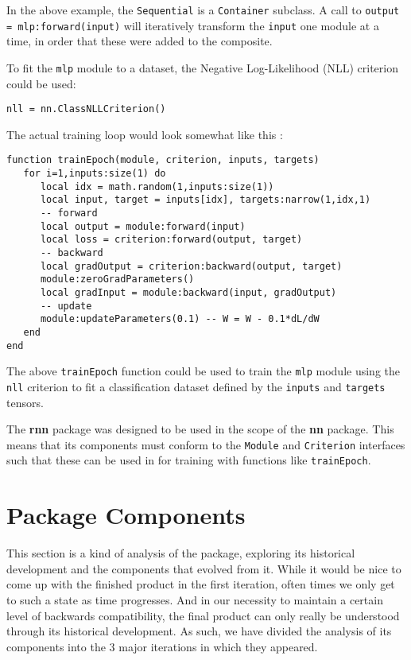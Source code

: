 \documentclass{article} %
\providecommand{\inlinecode}[1]{\texttt{#1}}
\begin{document}
In the above example, the \inlinecode{Sequential} is a \inlinecode{Container} subclass.
A call to \inlinecode{output = mlp:forward(input)} will iteratively transform the \inlinecode{input}
one module at a time, in order that these were added to the composite.

To fit the \inlinecode{mlp} module to a dataset, the Negative Log-Likelihood (NLL) criterion could be used:

\begin{verbatim}
nll = nn.ClassNLLCriterion()
\end{verbatim}

The actual training loop would look somewhat like this :
\begin{verbatim}
function trainEpoch(module, criterion, inputs, targets)
   for i=1,inputs:size(1) do
      local idx = math.random(1,inputs:size(1))
      local input, target = inputs[idx], targets:narrow(1,idx,1)
      -- forward
      local output = module:forward(input)
      local loss = criterion:forward(output, target)
      -- backward
      local gradOutput = criterion:backward(output, target)
      module:zeroGradParameters()
      local gradInput = module:backward(input, gradOutput)
      -- update
      module:updateParameters(0.1) -- W = W - 0.1*dL/dW
   end
end
\end{verbatim}

The above \inlinecode{trainEpoch} function could be used to train the
\inlinecode{mlp} module using the \inlinecode{nll} criterion
to fit a classification dataset defined by the \inlinecode{inputs} and 
\inlinecode{targets} tensors. 

The \textbf{rnn} package was designed to be used in the scope of the \textbf{nn} package.
This means that its components must conform to the \inlinecode{Module} and 
\inlinecode{Criterion} interfaces such that these can be used in 
for training with functions like \inlinecode{trainEpoch}.

\section{Package Components}

This section is a kind of analysis of the package, exploring 
its historical development and the components that evolved from it. 
While it would be nice to come up 
with the finished product in the first iteration, often times we only get to such a state 
as time progresses. And in our necessity to maintain a certain level of backwards compatibility,
the final product can only really be understood through its historical development.
As such, we have divided the analysis of its components into the 3 major iterations in 
which they appeared.
 
\end{document}
